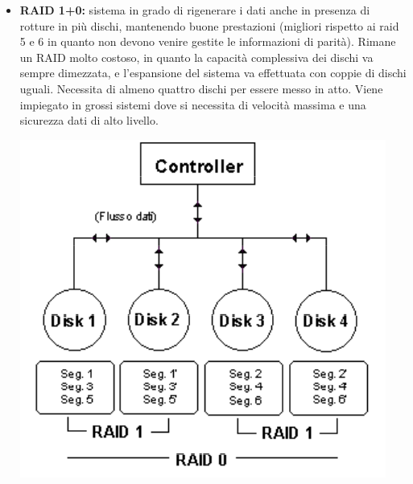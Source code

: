 \documentclass[a4paper]{report}
\begin{document}
\begin{itemize}
\item \textbf{RAID 1+0:} sistema in grado di rigenerare i dati anche in presenza di rotture in più dischi, mantenendo buone prestazioni (migliori rispetto ai raid 5 e 6 in quanto non devono venire gestite le informazioni di parità). Rimane un RAID molto costoso, in quanto la capacità complessiva dei dischi va sempre dimezzata, e l'espansione del sistema va effettuata con coppie di dischi uguali. Necessita di almeno quattro dischi per essere messo in atto. Viene impiegato in grossi sistemi dove si necessita di velocità massima e una sicurezza dati di alto livello. \begin{center}\includegraphics[scale=0.5]{raid1+0.png}\end{center}

\end{itemize}
\end{document}

